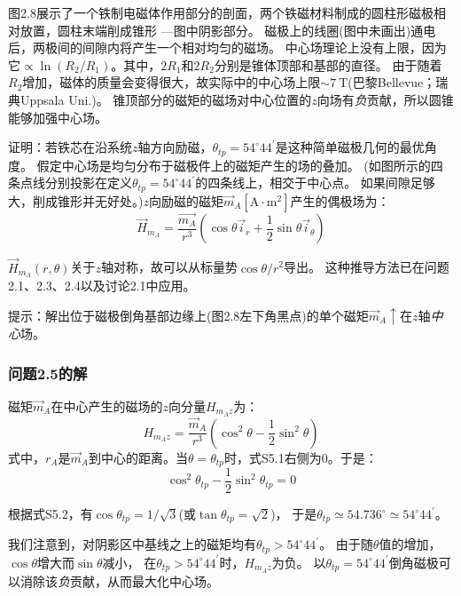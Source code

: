 图2.8展示了一个铁制电磁体作用部分的剖面，两个铁磁材料制成的圆柱形磁极相对放置，圆柱末端削成锥形
---图中阴影部分。
磁极上的线圈(图中未画出)通电后，两极间的间隙内将产生一个相对均匀的磁场。
中心场理论上没有上限，因为它$\propto \ln(R_2/R_1)$。其中，$2R_1$和$2R_2$分别是锥体顶部和基部的直径。
由于随着$R_2$增加，磁体的质量会变得很大，故实际中的中心场上限$\sim 7\ \mathrm{T}$(巴黎Bellevue；瑞典Uppsala Uni.)。
锥顶部分的磁矩的磁场对中心位置的$z$向场有\textit{负}贡献，所以圆锥能够加强中心场。

证明：若铁芯在沿系统$z$轴方向励磁，$\theta_{tp}=54^\circ 44^\prime$是这种简单磁极几何的最优角度。
假定中心场是均匀分布于磁极件上的磁矩产生的场的叠加。
(如图所示的四条点线分别投影在定义$\theta_{tp}=54^\circ 44^\prime$的四条线上，相交于中心点。
如果间隙足够大，削成锥形并无好处。)$z$向励磁的磁矩$\vec{m}_A [\mathrm{A\cdot m^2}]$产生的偶极场为：
\begin{equation}
\vec{H}_{m_A}=\frac{\vec{m_A}}{r^3}(\cos\theta \vec{i}_r+\frac{1}{2}\sin\theta\vec{i}_\theta)
\end{equation}

$\vec{H}_{m_A}(r,\theta)$关于$z$轴对称，故可以从标量势$\cos\theta/r^2$导出。
这种推导方法已在问题2.1、2.3、2.4以及讨论2.1中应用。

提示：解出位于磁极倒角基部边缘上(图2.8左下角黑点)的单个磁矩$\vec{m}_A \uparrow$在$z$轴\textit{中心}场。

\subsubsection*{问题2.5的解}
磁矩$\vec{m}_A$在中心产生的磁场的$z$向分量$H_{m_A z}$为：
\begin{equation*}
H_{m_A z}=\frac{\vec{m}_A}{r^3}(\cos^2\theta-\frac{1}{2}\sin^2\theta) \tag{S5.1}
\end{equation*}
式中，$r_A$是$\vec{m}_A$到中心的距离。当$\theta=\theta_{tp}$时，式S5.1右侧为0。于是：
\begin{equation*}
\cos^2\theta_{tp}-\frac{1}{2}\sin^2\theta_{tp}=0 \tag{S5.2}
\end{equation*}

根据式S5.2，有$\cos\theta_{tp}=1/\sqrt{3}$(或$\tan\theta_{tp}=\sqrt{2}$)，
于是$\theta_{tp}\simeq 54.736^\circ\simeq54^\circ 44^\prime$。

我们注意到，对阴影区中基线之上的磁矩均有$\theta_{tp}>54^\circ 44^\prime$。
由于随$\theta$值的增加，$\cos\theta$增大而$\sin\theta$减小，
在$\theta_{tp}>54^\circ 44^\prime$时，$H_{m_A z}$为负。
以$\theta_{tp}=54^\circ 44^\prime$倒角磁极可以消除该\textit{负}贡献，从而最大化中心场。

